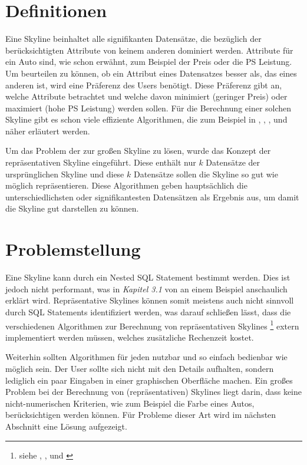 \section{Definitionen}
\label{ch:Einleitung:sec:Definitionen}
Eine Skyline beinhaltet alle signifikanten Datensätze, die bezüglich der berücksichtigten Attribute von keinem anderen dominiert werden. Attribute für ein Auto sind, wie schon erwähnt, zum Beispiel der Preis oder die PS Leistung. Um beurteilen zu können, ob ein Attribut eines Datensatzes besser als, das eines anderen ist, wird eine Präferenz des Users benötigt. Diese Präferenz gibt an, welche Attribute betrachtet und welche davon minimiert (geringer Preis) oder maximiert (hohe PS Leistung) werden sollen. Für die Berechnung einer solchen Skyline gibt es schon viele effiziente Algorithmen, die zum Beispiel in \cite{borzsony2001skyline}, \cite{Chan:2006:HDS:2117976.2118017}, \cite{Kossmann:2002:SSS:1287369.1287394}, \cite{Papadias:2003:OPA:872757.872814} und \cite{Tan:2001:EPS:645927.672217} näher erläutert werden.

Um das Problem der zur großen Skyline zu lösen, wurde das Konzept der repräsentativen Skyline eingeführt. Diese enthält nur $k$ Datensätze der ursprünglichen Skyline und diese $k$ Datensätze sollen die Skyline so gut wie möglich repräsentieren. Diese Algorithmen geben hauptsächlich die unterschiedlichsten oder signifikantesten Datensätzen als Ergebnis aus, um damit die Skyline gut darstellen zu können. 
\section{Problemstellung}
\label{ch:Einleitung:sec:Problemstellung}
Eine Skyline kann durch ein Nested SQL Statement bestimmt werden. Dies ist jedoch nicht performant, was in \textit{Kapitel 3.1} von \cite{borzsony2001skyline} an einem Beispiel anschaulich erklärt wird. Repräsentative Skylines können somit meistens auch nicht sinnvoll durch SQL Statements identifiziert werden, was darauf schließen lässt, dass die verschiedenen Algorithmen zur Berechnung von repräsentativen Skylines \footnote{siehe \cite{Tao:2009:DRS:1546683.1547325}, \cite{cai2015efficient}, \cite{magnani2014taking} und \cite{4221657}} extern implementiert werden müssen, welches zusätzliche Rechenzeit kostet.

Weiterhin sollten Algorithmen für jeden nutzbar und so einfach bedienbar wie möglich sein. Der User sollte sich nicht mit den Details aufhalten, sondern lediglich ein paar Eingaben in einer graphischen Oberfläche machen. 
Ein großes Problem bei der Berechnung von (repräsentativen) Skylines liegt darin, dass keine nicht-numerischen Kriterien, wie zum Beispiel die Farbe eines Autos, berücksichtigen werden können. 
Für Probleme dieser Art wird im nächsten Abschnitt eine Lösung aufgezeigt.
